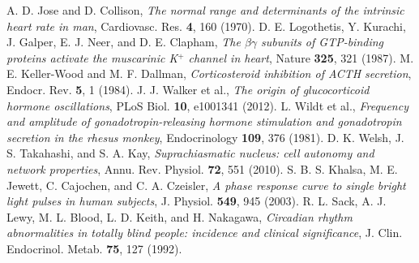  A. D. Jose and D. Collison, \emph{The normal range and determinants of the intrinsic heart rate in man}, Cardiovasc. Res. \textbf{4}, 160 (1970).
 D. E. Logothetis, Y. Kurachi, J. Galper, E. J. Neer, and D. E. Clapham, \emph{The $\beta\gamma$ subunits of GTP-binding proteins activate the muscarinic K$^+$ channel in heart}, Nature \textbf{325}, 321 (1987).
 M. E. Keller-Wood and M. F. Dallman, \emph{Corticosteroid inhibition of ACTH secretion}, Endocr. Rev. \textbf{5}, 1 (1984).
 J. J. Walker et al., \emph{The origin of glucocorticoid hormone oscillations}, PLoS Biol. \textbf{10}, e1001341 (2012).
 L. Wildt et al., \emph{Frequency and amplitude of gonadotropin-releasing hormone stimulation and gonadotropin secretion in the rhesus monkey}, Endocrinology \textbf{109}, 376 (1981).
 D. K. Welsh, J. S. Takahashi, and S. A. Kay, \emph{Suprachiasmatic nucleus: cell autonomy and network properties}, Annu. Rev. Physiol. \textbf{72}, 551 (2010).
 S. B. S. Khalsa, M. E. Jewett, C. Cajochen, and C. A. Czeisler, \emph{A phase response curve to single bright light pulses in human subjects}, J. Physiol. \textbf{549}, 945 (2003).
 R. L. Sack, A. J. Lewy, M. L. Blood, L. D. Keith, and H. Nakagawa, \emph{Circadian rhythm abnormalities in totally blind people: incidence and clinical significance}, J. Clin. Endocrinol. Metab. \textbf{75}, 127 (1992).
